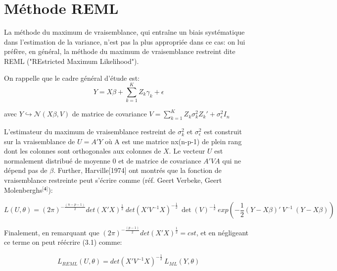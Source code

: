 \documentclass[12pt,fleqn]{book} %
\begin{document}

\chapter{Méthode REML}


\vspace{1em}

La méthode du maximum de vraisemblance, qui entraîne un biais systématique dans l’estimation de la variance, n’est pas la plus appropriée dans ce cas: on lui préfère, en général, la méthode du maximum de vraisemblance restreint dite REML ("REstricted Maximum Likelihood").

\vspace{2em}

On rappelle que le cadre général d'étude est: 
\begin{equation*} 
Y=X\beta+\sum_{k=1}^{K} Z_k \gamma_k+\epsilon 
\end{equation*}

avec \: $ Y\hookrightarrow\mathcal{N}(X\beta,V)$ \:de matrice de covariance $V=\sum_{k=1}^{K} Z_k \sigma_k^2 Z_k'+\sigma_{\epsilon}^2 I_{n}$

\vspace{2em}

L'estimateur du maximum de vraisemblance restreint de $\sigma_k^2$ et $\sigma_{\epsilon}^2$ est construit sur la vraisemblance de $U=A'Y$ où A est une matrice n\:x\:(n-p-1) de plein rang dont les colonnes sont orthogonales aux colonnes de $X$. Le vecteur $U$ est normalement distribué de moyenne 0 et de matrice de covariance $A'V A$ qui ne dépend pas de $\beta$. Further, Harville[1974] ont montrés que la fonction de vraisemblance restreinte peut s'écrire comme (réf. Geert Verbeke, Geert Molenberghs$^{\textbf{[4]}}$):

\begin{equation}
L(U,\theta)=(2\pi)^{-\frac{(n-p-1)}{2}} det(X'X)^{\frac{1}{2}}\:det(X'V^{-1}X)^{-\frac{1}{2}}\:\det(V)^{-\frac{1}{2}}\:exp\left(-\frac{1}{2}(Y-X\beta)'\:V^{-1}\:(Y-X\beta)\right) 
\end{equation}

Finalement, en remarquant que $(2\pi)^{-\frac{(p-1)}{2}} det(X'X)^{\frac{1}{2}}=cst$, et en négligeant ce terme on peut réécrire (3.1) comme:

\begin{equation}
L_{REML}(U,\theta)= det(X'V^{-1}X)^{-\frac{1}{2}}\: L_{ML}(Y,\theta)
\end{equation}
\end{document}
